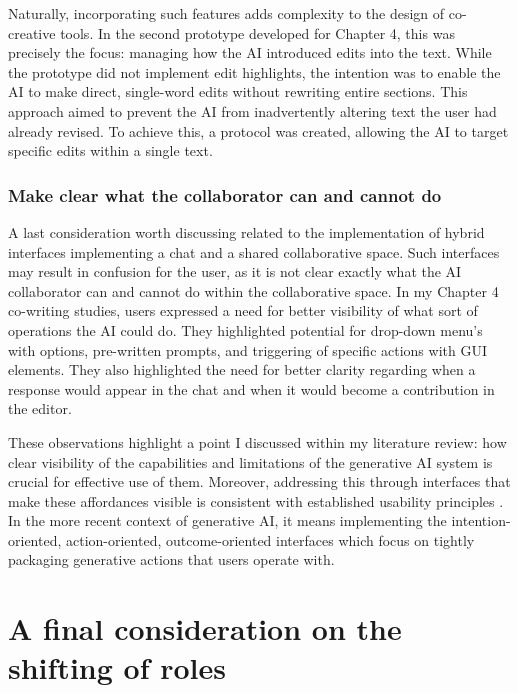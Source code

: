 Naturally, incorporating such features adds complexity to the design of co-creative tools. In the second prototype developed for Chapter 4, this was precisely the focus: managing how the AI introduced edits into the text. While the prototype did not implement edit highlights, the intention was to enable the AI to make direct, single-word edits without rewriting entire sections. This approach aimed to prevent the AI from inadvertently altering text the user had already revised. To achieve this, a protocol was created, allowing the AI to target specific edits within a single text.

\subsubsection{Make clear what the collaborator can and cannot do}

A last consideration worth discussing related to the implementation of hybrid interfaces implementing a chat and a shared collaborative space. Such interfaces may result in confusion for the user, as it is not clear exactly what the AI collaborator can and cannot do within the collaborative space. In my Chapter 4 co-writing studies, users expressed a need for better visibility of what sort of operations the AI could do. They highlighted potential for drop-down menu's with options, pre-written prompts, and triggering of specific actions with GUI elements. They also highlighted the need for better clarity regarding when a response would appear in the chat and when it would become a contribution in the editor. 

These observations highlight a point I discussed within my literature review: how clear visibility of the capabilities and limitations of the generative AI system is crucial for effective use of them. Moreover, addressing this through interfaces that make these affordances visible is consistent with established usability principles \cite{Nielsen1994-df}. In the more recent context of generative AI, it means implementing the intention-oriented, action-oriented, outcome-oriented interfaces \cite{Weisz2024-io, Schaad2025-ca} which focus on tightly packaging generative actions that users operate with. 


\section{A final consideration on the shifting of roles}

